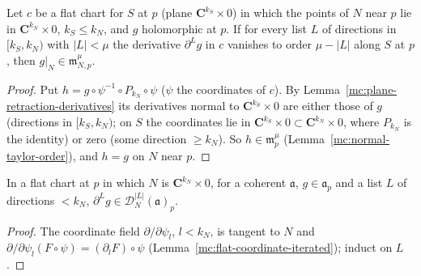 \begin{lemma}
\label{mc:normal-taylor-along}
\leanok
Let \(c\) be a flat chart for \(S\) at \(p\) (plane \(\mathbf C^{k_S}\times0\)) in which the points of \(N\) near \(p\) lie in \(\mathbf C^{k_N}\times0\), \(k_S\le k_N\), and \(g\)
holomorphic at \(p\). If for every list \(L\) of directions in \([k_S,k_N)\) with \(|L|<\mu\) the derivative \(\partial^Lg\) in \(c\) vanishes to order \(\mu-|L|\) along \(S\)
at \(p\), then \(g|_N\in\mathfrak m_{N,p}^\mu\).
\end{lemma}
\begin{proof}
\leanok
Put \(h=g\circ\psi^{-1}\circ P_{k_N}\circ\psi\) (\(\psi\) the coordinates of \(c\)). By Lemma~\ref{mc:plane-retraction-derivatives} its derivatives normal to
\(\mathbf C^{k_S}\times0\) are either those of \(g\) (directions in \([k_S,k_N)\); on \(S\) the coordinates lie in \(\mathbf C^{k_S}\times0\subset\mathbf C^{k_N}\times0\), where
\(P_{k_N}\) is the identity) or zero (some direction \(\ge k_N\)). So \(h\in\mathfrak m_p^\mu\) (Lemma~\ref{mc:normal-taylor-order}), and \(h=g\) on \(N\) near \(p\).
\end{proof}

\begin{lemma}
\label{mc:normal-derivative-along-ideal}
\leanok
In a flat chart at \(p\) in which \(N\) is \(\mathbf C^{k_N}\times0\), for a coherent \(\mathfrak a\), \(g\in\mathfrak a_p\) and a list \(L\) of directions \(<k_N\),
\(\partial^Lg\in\mathcal D_N^{|L|}(\mathfrak a)_p\).
\end{lemma}
\begin{proof}
\leanok
The coordinate field \(\partial/\partial\psi_l\), \(l<k_N\), is tangent to \(N\) and \(\partial/\partial\psi_l(F\circ\psi)=(\partial_lF)\circ\psi\)
(Lemma~\ref{mc:flat-coordinate-iterated}); induct on \(L\).
\end{proof}

